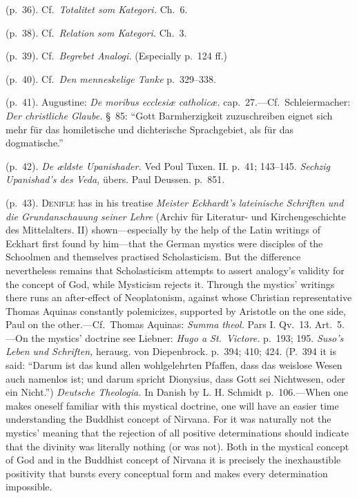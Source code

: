 \documentclass[12pt,a4paper]{book}
\begin{document}
 (p.~36). Cf.\ \emph{Totalitet som Kategori.} Ch.~6.

 (p.~38). Cf.\ \emph{Relation som Kategori.} Ch.~3.

 (p.~39). Cf.\ \emph{Begrebet Analogi.} (Especially p.~124 ff.)

 (p.~40). Cf.\ \emph{Den menneskelige Tanke} p.~329--338.

 (p.~41). Augustine: \emph{De moribus ecclesiæ catholicæ.} cap.~27.---Cf.\ Schleiermacher:
\emph{Der christliche Glaube.} §~85: ``Gott Barmherzigkeit zuzuschreiben eignet sich mehr für das
homiletische und dichterische Sprachgebiet, als für das dogmatische.''

 (p.~42). \emph{De ældste Upanishader.} Ved Poul Tuxen. II. p.~41; 143--145. \emph{Sechzig
Upanishad's des Veda,} übers. Paul Deussen. p.~851.

 (p.~43). \textsc{Denifle} has in his treatise \emph{Meister Eckhardt's lateinische Schriften und
die Grundanschauung seiner Lehre} (Archiv für Literatur- und Kirchengeschichte des Mittelalters.
II) shown---especially by the help of the Latin writings of Eckhart first found by him---that the
German mystics were disciples of the Schoolmen and themselves practised Scholasticism. But the
difference nevertheless remains that Scholasticism attempts to assert analogy's validity for the
concept of God, while Mysticism rejects it. Through the mystics' writings there runs an
after-effect of Neoplatonism, against whose Christian representative Thomas Aquinas constantly
polemicizes, supported by Aristotle on the one side, Paul on the other.---Cf.\ Thomas Aquinas:
\emph{Summa theol.} Pars I. Qv.~13. Art.~5.---On the mystics' doctrine see Liebner: \emph{Hugo a
St.\ Victore.} p.~193; 195. \emph{Suso's Leben und Schriften,} herausg. von Diepenbrock. p.~394;
410; 424. (P.~394 it is said: ``Darum ist das kund allen wohlgelehrten Pfaffen, dass das weislose
Wesen auch namenlos ist; und darum spricht Dionysius, dass Gott sei Nichtwesen, oder ein Nicht.'')
\emph{Deutsche Theologia.} In Danish by L. H. Schmidt p.~106.---When one makes oneself familiar
with this mystical doctrine, one will have an easier time understanding the Buddhist concept of
Nirvana. For it was naturally not the mystics' meaning that the rejection of all positive
determinations should indicate that the divinity was literally nothing (or was not). Both in the
mystical concept of God and in the Buddhist concept of Nirvana it is precisely the inexhaustible
positivity that bursts every conceptual form and makes every determination impossible.
\end{document}
